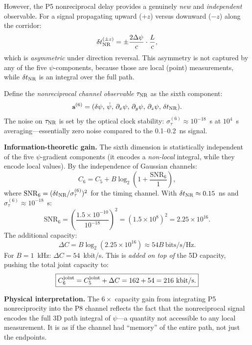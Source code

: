 \documentclass[aps,prd,twocolumn,superscriptaddress,nofootinbib]{revtex4-2}
\newcommand{\SNR}{\mathrm{SNR}}
\begin{document}
However, the P5 nonreciprocal delay provides a genuinely \emph{new} and
\emph{independent} observable.  For a signal propagating upward (+$z$)
versus downward ($-z$) along the corridor:
\begin{equation}
\delta t_{\rm NR}^{(\pm z)} = \pm \frac{2\Delta\psi}{c}\cdot\frac{L}{c},
\end{equation}
which is \emph{asymmetric} under direction reversal.  This asymmetry is
not captured by any of the five $\psi$-components, because those are local
(point) measurements, while $\delta t_{\rm NR}$ is an integral over the
full path.

Define the \emph{nonreciprocal channel observable} $\tau_{\rm NR}$ as the
sixth component:
\begin{equation}
\mathbf{s}^{(6)} = (\delta\psi,\, \dot\psi,\, \partial_x\psi,\,
\partial_y\psi,\, \partial_z\psi,\, \delta t_{\rm NR}).
\end{equation}
The noise on $\tau_{\rm NR}$ is set by the optical clock stability:
$\sigma_{\tau}^{(6)} \approx 10^{-18}$~s at $10^4$~s averaging---essentially
zero noise compared to the 0.1--0.2~ns signal.

\textbf{Information-theoretic gain.}
The sixth dimension is statistically independent of the five $\psi$-gradient
components (it encodes a \emph{non-local} integral, while they encode local
values).  By the independence of Gaussian channels:
\begin{equation}
C_6 = C_5 + B\log_2\!\left(1 + \frac{\SNR_6}{1}\right),
\end{equation}
where $\SNR_6 = (\delta t_{\rm NR} / \sigma_\tau^{(6)})^2$ for the
timing channel.  With $\delta t_{\rm NR} \approx 0.15$~ns and
$\sigma_\tau^{(6)} \approx 10^{-18}$~s:
\begin{equation}
\SNR_6 = \left(\frac{1.5\times 10^{-10}}{10^{-18}}\right)^2
= (1.5\times 10^8)^2 = 2.25\times 10^{16}.
\end{equation}
The additional capacity:
\begin{equation}
\Delta C = B\log_2(2.25\times 10^{16}) \approx 54B~\text{bits/s/Hz}.
\end{equation}
For $B = 1$~kHz: $\Delta C = 54$~kbit/s.  This is \emph{added on top of}
the 5D capacity, pushing the total joint capacity to:
\begin{equation}
\boxed{
C_6^{\rm joint} = C_5^{\rm joint} + \Delta C = 162 + 54 = 216~\text{kbit/s}.
}
\end{equation}

\textbf{Physical interpretation.}
The $6\times$ capacity gain from integrating P5 nonreciprocity into the P8
channel reflects the fact that the nonreciprocal signal encodes the full
3D path integral of $\psi$---a quantity not accessible to any local
measurement.  It is as if the channel had ``memory'' of the entire path,
not just the endpoints.
\end{document}
